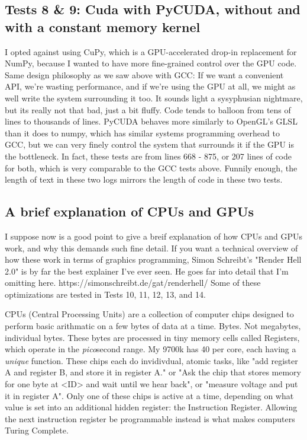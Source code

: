 \documentclass[%
 reprint,
 amsmath,amssymb,
 aps,
showkeys,
]{revtex4-2}
\begin{document}
\subsection{Tests 8 & 9: Cuda with PyCUDA, without and with a constant memory kernel}
I opted against using CuPy, which is a GPU-accelerated drop-in replacement for NumPy, because I wanted to have more fine-grained control over the GPU code. Same design philosophy as we saw above with GCC: If we want a convenient API, we're wasting performance, and if we're using the GPU at all, we might as well write the system surrounding it too. It sounds light a sysyphusian nightmare, but its really not that bad, just a bit fluffy. Code tends to balloon from tens of lines to thousands of lines. PyCUDA behaves more similarly to OpenGL's GLSL than it does to numpy, which has similar systems programming overhead to GCC, but we can very finely control the system that surrounds it if the GPU is the bottleneck. In fact, these tests are from lines 668 - 875, or 207 lines of code for both, which is very comparable to the GCC tests above. Funnily enough, the length of text in these two logs mirrors the length of code in these two tests.

\subsection{A brief explanation of CPUs and GPUs}

I suppose now is a good point to give a breif explanation of how CPUs and GPUs work, and why this demands such fine detail. If you want a technical overview of how these work in terms of graphics programming, Simon Schreibt's "Render Hell 2.0" is by far the best explainer I've ever seen. He goes far into detail that I'm omitting here. https://simonschreibt.de/gat/renderhell/ Some of these optimizations are tested in Tests 10, 11, 12, 13, and 14.

CPUs (Central Processing Units) are a collection of computer chips designed to perform basic arithmatic on a few bytes of data at a time. Bytes. Not megabytes, individual bytes. These bytes are processed in tiny memory cells called Registers, which operate in the \textit{pico}second range. My 9700k has 40 per core, each having a \textit{unique} function. These chips each do invidivdual, atomic tasks, like "add register A and register B, and store it in register A." or "Ask the chip that stores memory for one byte at <ID> and wait until we hear back", or "measure voltage and put it in register A". Only one of these chips is active at a time, depending on what value is set into an additional hidden register: the Instruction Register. Allowing the next instruction register be programmable instead is what makes computers Turing Complete.
\end{document}
